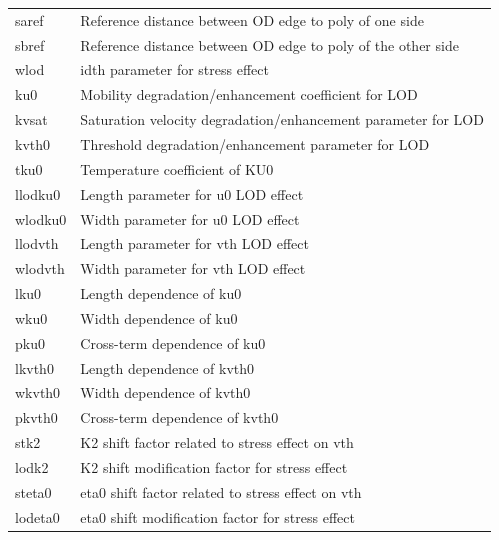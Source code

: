 \begin{longtable}{l l}
{\small saref} & {\small Reference distance between OD edge to poly of one side} \\
{\small sbref} & {\small Reference distance between OD edge to poly of the other side} \\
{\small wlod} & {\small idth parameter for stress effect} \\
{\small ku0} & {\small Mobility degradation/enhancement coefficient for LOD} \\
{\small kvsat} & {\small Saturation velocity degradation/enhancement parameter for LOD} \\
{\small kvth0} & {\small Threshold degradation/enhancement parameter for LOD} \\
{\small tku0} & {\small Temperature coefficient of KU0} \\
{\small llodku0} & {\small Length parameter for u0 LOD effect} \\
{\small wlodku0} & {\small Width parameter for u0 LOD effect} \\
{\small llodvth} & {\small Length parameter for vth LOD effect} \\
{\small wlodvth} & {\small Width parameter for vth LOD effect} \\
{\small lku0} & {\small Length dependence of ku0} \\
{\small wku0} & {\small Width dependence of ku0} \\
{\small pku0} & {\small Cross-term dependence of ku0} \\
{\small lkvth0} & {\small Length dependence of kvth0} \\
{\small wkvth0} & {\small Width dependence of kvth0} \\
{\small pkvth0} & {\small Cross-term dependence of kvth0} \\
{\small stk2} & {\small K2 shift factor related to stress effect on vth} \\
{\small lodk2} & {\small K2 shift modification factor for stress effect} \\
{\small steta0} & {\small eta0 shift factor related to stress effect on vth} \\
{\small lodeta0} & {\small eta0 shift modification factor for stress effect} \\


\end{longtable}
